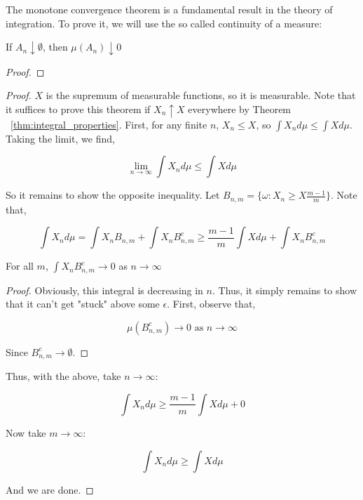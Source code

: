     The monotone convergence theorem is a fundamental result in the theory of integration. 
    To prove it, we will use the so called continuity of a measure: 

    \begin{theorem}
        If $A_n \downarrow \emptyset$, then $\mu(A_n) \downarrow 0$
    \end{theorem}

    \begin{proof}

    \end{proof}

    \begin{proof}
        $X$ is the supremum of measurable functions, so it is measurable. Note that it suffices to prove this theorem if $X_n \uparrow X$ everywhere by Theorem ~\ref{thm:integral_properties}. 
        First, for any finite $n$, $X_n \leq X$, so $\int X_n d\mu \leq \int X d\mu$. Taking the limit, we find, 
        
        \[ \lim_{n \to \infty}\int X_n d\mu \leq \int X d\mu \] 

        So it remains to show the opposite inequality. Let $B_{n,m} = \{\omega : X_n \geq X \frac{m-1}{m}\}$. Note that, 

        \[ \int X_n d\mu  = \int X_n B_{n,m} + \int X_n B_{n,m}^c \geq \frac{m-1}{m} \int X d\mu + \int X_n B_{n,m}^c  \]

        \begin{Proposition} 
            For all $m$, $\int X_n B_{n,m}^c \to 0$ as $n \to \infty$
        \end{Proposition}

        \begin{proof}
           Obviously, this integral is decreasing in $n$. Thus, it simply remains to 
           show that it can't get "stuck" above some $\epsilon$. First, observe that, 

           \[ \mu(B_{n,m}^c) \to 0 \text{ as } n \to \infty \]

           Since $B_{n,m}^c \to \emptyset$. 
        \end{proof}

        Thus, with the above, take $n \to \infty$: 

        \[ \int X_n d\mu \geq \frac{m-1}{m} \int X d\mu + 0 \]

        Now take $m \to \infty$: 

        \[ \int X_n d\mu \geq \int X d\mu \]

        And we are done.

    \end{proof}

